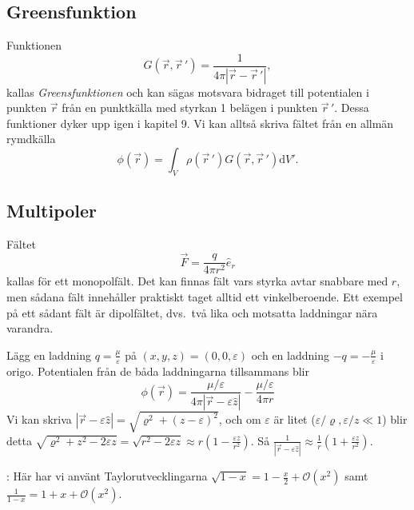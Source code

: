\documentclass[%
oneside,                 %
final,                   %
10pt]{article}
\newcommand{\longinlinecomment}[3]{{\color{red}{\bf #1}: #2}}
\begin{document}
\subsection{Greensfunktion}

Funktionen
\begin{equation}
G\left( \vec{r},\vec{r}\,' \right) = \frac{1}{4 \pi \left| \vec{r} - \vec{r}\,' \right|},
\end{equation}
kallas \emph{Greensfunktionen} och kan sägas motsvara bidraget till potentialen i punkten $\vec{r}$ från en punktkälla med styrkan 1 belägen i punkten $\vec{r}\,'$. Dessa funktioner dyker upp igen i kapitel 9. Vi kan alltså skriva fältet från en allmän rymdkälla
\begin{equation}
\phi(\vec{r}) = \int_V \rho\left(\vec{r}\,'\right) G\left( \vec{r},\vec{r}\,' \right) \mbox{d}V'.
\end{equation}

\subsection{Multipoler}

Fältet
\begin{equation}
  \vec{F} = \frac{q}{4 \pi r^2} \hat{e}_{r}
\end{equation}
kallas för ett monopolfält.  Det kan finnas fält vars styrka avtar snabbare med $r$, men sådana fält innehåller praktiskt taget alltid ett vinkelberoende. Ett exempel på ett sådant fält är dipolfältet, dvs.~två lika och motsatta laddningar nära varandra. 

Lägg en laddning $q = \frac{\mu}{\varepsilon}$ på $(x,y,z)=(0,0,\varepsilon)$ och en laddning
$-q = -\frac{\mu}{\varepsilon}$ i origo. Potentialen från de båda laddningarna tillsammans blir
\begin{equation}
\phi(\vec{r})=\frac{\mu/\varepsilon}{4\pi|\vec{r}-\varepsilon\hat z|}-\frac{\mu/\varepsilon}{4\pi r}
\end{equation}
Vi kan skriva $|\vec{r}-\varepsilon \hat z|=\sqrt{\varrho^2+(z-\varepsilon)^2}$, och om
$\varepsilon$ är litet ($\varepsilon/\varrho,\varepsilon/z \ll 1$) blir detta $\sqrt{\varrho^2+z^2-2\varepsilon
z}=\sqrt{r^2-2\varepsilon z}\approx r(1-\frac{\varepsilon z}{r^2})$. Så $\frac{1}{|\vec{r}-\varepsilon\hat z|}\approx \frac{1}{r}(1+\frac{\varepsilon z}{r^2})$.

\longinlinecomment{Comment 8}{ Här har vi använt Taylorutvecklingarna $\sqrt{1-x} = 1 - \frac{x}{2} + \mathcal{O}(x^2)$ samt $\frac{1}{1-x} = 1 + x + \mathcal{O}(x^2)$. }{ Här har vi använt }
\end{document}
